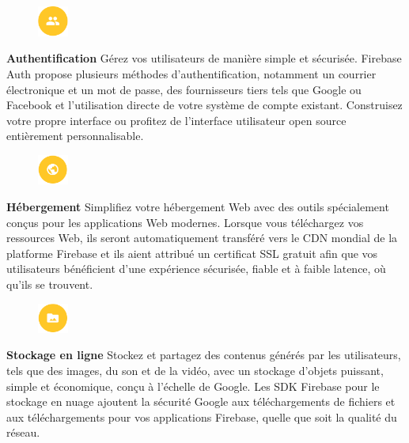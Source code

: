 \begin{figure}
	\includegraphics[width=1cm]{Images/chapter2/firebase_services/authentication.png}
\end{figure}
\textbf{Authentification} Gérez vos utilisateurs de manière simple et sécurisée. Firebase Auth propose plusieurs méthodes d’authentification, notamment un courrier électronique et un mot de passe, des fournisseurs tiers tels que Google ou Facebook et l’utilisation directe de votre système de compte existant. Construisez votre propre interface ou profitez de l'interface utilisateur open source entièrement personnalisable.\medskip

\begin{figure}
	\includegraphics[width=1cm]{Images/chapter2/firebase_services/hosting.png}
\end{figure}
\textbf{Hébergement} Simplifiez votre hébergement Web avec des outils spécialement conçus pour les applications Web modernes. Lorsque vous téléchargez vos ressources Web, ils seront automatiquement transféré vers le CDN mondial de la platforme Firebase et ils aient attribué un certificat SSL gratuit afin que vos utilisateurs bénéficient d'une expérience sécurisée, fiable et à faible latence, où qu'ils se trouvent.\medskip

\begin{figure}
	\includegraphics[width=1cm]{Images/chapter2/firebase_services/cloud_storage.png}
\end{figure}
\textbf{Stockage en ligne} Stockez et partagez des contenus générés par les utilisateurs, tels que des images, du son et de la vidéo, avec un stockage d’objets puissant, simple et économique, conçu à l’échelle de Google. Les SDK Firebase pour le stockage en nuage ajoutent la sécurité Google aux téléchargements de fichiers et aux téléchargements pour vos applications Firebase, quelle que soit la qualité du réseau.\medskip

